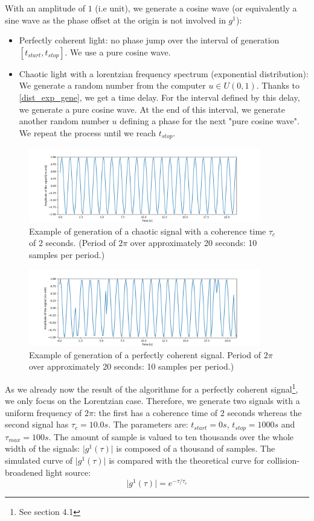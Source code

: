 \documentclass[10pt]{report}
\begin{document}
With an amplitude of $1$ (i.e unit), we generate a cosine wave (or equivalently a sine wave as the phase offset at the origin is not involved in $g^1$):
\begin{itemize}
	\item Perfectly coherent light: no phase jump over the interval of generation $\left[ t_{start}, t_{stop} \right]$. We use a pure cosine wave.
	\item Chaotic light with a lorentzian frequency spectrum (exponential distribution): We generate a random number from the computer $u \in U(0,1)$. Thanks to \eqref{dist_exp_gene}, we get a time delay. For the interval defined by this delay, we generate a pure cosine wave. At the end of this interval, we generate another random number $u$ defining a phase for the next "pure cosine wave". We repeat the process until we reach $t_{stop}$.
\end{itemize}

\begin{figure}[h!]
\caption{Example of generation of a chaotic signal with a coherence time $\tau_c$ of 2 seconds. (Period of $2\pi$ over approximately 20 seconds: 10 samples per period.)}
\centering
\includegraphics[width=0.9\textwidth]{coh_gen}
\end{figure}

\begin{figure}[h!]
\caption{Example of generation of a perfectly coherent signal. Period of $2\pi$ over approximately 20 seconds: 10 samples per period.)}
\centering
\includegraphics[width=0.9\textwidth]{chaos_gen}
\end{figure}

As we already now the result of the algorithme for a perfectly coherent signal\footnote{See section 4.1}, we only focus on the Lorentzian case. Therefore, we generate two signals with a uniform frequency of $2\pi$: the first has a coherence time of 2 seconds whereas the second signal has $\tau_c = 10.0s$. The parameters are: $t_{start} = 0s$, $t_{stop} = 1000s$ and $\tau_{max}=100s$. The amount of sample is valued to ten thousands over the whole width of the signals: $\vert g^1(\tau) \vert$ is composed of a thousand of samples. The simulated curve of $\vert g^1(\tau) \vert$ is compared with the theoretical curve for collision-broadened light source:
\begin{equation}
\vert g^1(\tau) \vert = e^{-\tau/\tau_c}
\end{equation}
\end{document}
